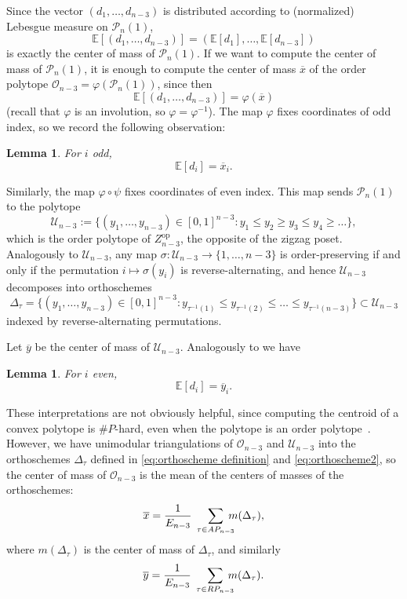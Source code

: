 \documentclass{article}
\newtheorem{lemma}[theorem]{Lemma}
\theoremstyle{definition}
\begin{document}
Since the vector $(d_1, \dots , d_{n-3})$ is distributed according to (normalized) Lebesgue measure on $\mathcal{P}_n(1)$,
\[
	\mathbb{E}[(d_1, \dots , d_{n-3})] = (\mathbb{E}[d_1], \dots , \mathbb{E}[d_{n-3}])
\]
is exactly the center of mass of $\mathcal{P}_n(1)$. If we want to compute the center of mass of $\mathcal{P}_n(1)$, it is enough to compute the center of mass $\overline{x}$ of the order polytope $\mathcal{O}_{n-3} = \varphi(\mathcal{P}_n(1))$, since then
\[
	\mathbb{E}[(d_1, \dots , d_{n-3})] = \varphi(\overline{x})
\]
(recall that $\varphi$ is an involution, so $\varphi = \varphi^{-1}$). The map $\varphi$ fixes coordinates of odd index, so we record the following observation:

\begin{lemma}\label{lem:com odd coords}
	For $i$ odd,
	\[
		\mathbb{E}[d_i] = \overline{x}_i.
	\]
\end{lemma}

Similarly, the map $\varphi \circ \psi$ fixes coordinates of even index. This map sends $\mathcal{P}_n(1)$ to the polytope
\[
	\mathcal{U}_{n-3} := \{(y_1, \dots , y_{n-3}) \in [0,1]^{n-3} : y_1 \leq y_2 \geq y_3 \leq y_4 \geq \dots \},
\]
which is the order polytope of $Z_{n-3}^{\text{op}}$, the opposite of the zigzag poset. Analogously to $\mathcal{U}_{n-3}$, any map $\sigma: \mathcal{U}_{n-3} \to \{1, \dots , n-3\}$ is order-preserving if and only if the permutation $i \mapsto \sigma(y_i)$ is reverse-alternating, and hence $\mathcal{U}_{n-3}$ decomposes into orthoschemes
\begin{equation}\label{eq:orthoscheme2}
	\Delta_\tau = \{(y_1, \dots , y_{n-3}) \in [0,1]^{n-3}: y_{\tau^{-1}(1)} \leq y_{\tau^{-1}(2)} \leq \dots \leq y_{\tau^{-1}(n-3)} \} \subset \mathcal{U}_{n-3}
\end{equation}
indexed by reverse-alternating permutations.

Let $\overline{y}$ be the center of mass of $\mathcal{U}_{n-3}$. Analogously to  we have
\begin{lemma}\label{lem:com even coords}
	For $i$ even,
	\[
		\mathbb{E}[d_i] = \overline{y}_i.
	\]
\end{lemma}

These interpretations are not obviously helpful, since computing the centroid of a convex polytope is $\#P$-hard, even when the polytope is an order polytope~\cite{rademacherApproximatingCentroidHard2007}.
However, we have unimodular triangulations of $\mathcal{O}_{n-3}$ and $\mathcal{U}_{n-3}$ into the orthoschemes $\Delta_\tau$ defined in \eqref{eq:orthoscheme definition} and \eqref{eq:orthoscheme2}, so the center of mass of $\mathcal{O}_{n-3}$ is the mean of the centers of masses of the orthoschemes:
\begin{equation}\label{eq:com1}
	\overline{x} = \frac{1}{E_{n-3}}\; \smashoperator[r]{\sum_{\tau \in AP_{n-3}}}\; m(\Delta_\tau),
\end{equation}
where $m(\Delta_\tau)$ is the center of mass of $\Delta_\tau$, and similarly
\begin{equation}\label{eq:com2}
	\overline{y} = \frac{1}{E_{n-3}}\; \smashoperator[r]{\sum\limits_{\tau \in RP_{n-3}}}\; m(\Delta_\tau).
\end{equation}
\end{document}
